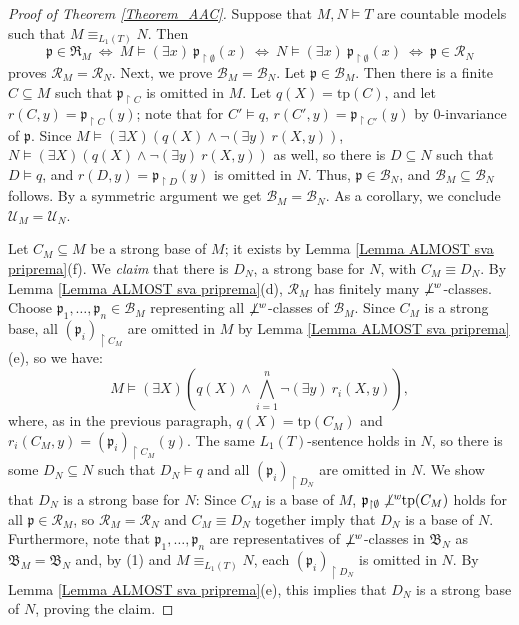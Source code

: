 \documentclass{amsart}
\theoremstyle{definition}
\theoremstyle{definition}
\def\strok{\restriction}
\newcommand{\nwor}{\not\perp\hspace*{-0.4em}^{\mathit w}}
\newcommand{\tp}{\mathrm{tp}}
\begin{document}
\begin{proof}[Proof of Theorem \ref{Theorem_AAC}]
    Suppose that $M,N\models T$ are countable models such that $M\equiv_{L_1(T)}N$. Then 
    $$\mathfrak p\in\mathfrak R_M \ \Leftrightarrow \  M\models (\exists x)\ \mathfrak p_{\strok\emptyset}(x) \ \Leftrightarrow \ N\models (\exists x)\ \mathfrak p_{\strok\emptyset}(x) \ \Leftrightarrow \ \mathfrak p\in\mathcal R_N$$ 
    proves $\mathcal R_M=\mathcal R_N$.  Next, we prove $\mathcal B_M=\mathcal B_N$. Let $\mathfrak p\in\mathcal B_M$. Then there is a finite $C\subseteq M$ such that $\mathfrak p_{\strok C}$ is omitted in $M$. Let $q(X)=\tp(C)$, and let $r(C,y)=\mathfrak p_{\strok C}(y)$; note that for $C'\models q$, $r(C',y)=\mathfrak p_{\strok C'}(y)$ by $0$-invariance of $\mathfrak p$. Since $M\models (\exists X)(q(X)\land\lnot(\exists y)\ r(X,y))$, $N\models(\exists X)(q(X)\land\lnot(\exists y)\ r(X,y))$ as well, so there is $D\subseteq N$ such that $D\models q$, and $r(D,y)=\mathfrak p_{\strok D}(y)$ is omitted in $N$. Thus, $\mathfrak p\in\mathcal B_N$, and $\mathcal B_M\subseteq\mathcal B_N$ follows. By a symmetric argument we get $\mathcal B_M=\mathcal B_N$. As a corollary, we conclude $\mathcal U_M=\mathcal U_N$.

Let $C_M\subseteq M$ be a strong base of $M$; it exists by Lemma \ref{Lemma ALMOST sva priprema}(f). We {\it claim} that there is $D_N$, a strong base for $N$, with $C_M\equiv D_N$. By Lemma \ref{Lemma ALMOST sva priprema}(d), $\mathcal R_M$ has finitely many $\nwor$-classes. Choose $\mathfrak p_1,\dots,\mathfrak p_n\in\mathcal B_M$ representing all $\nwor$-classes of $\mathcal B_M$. Since $C_M$ is a strong base, all $(\mathfrak p_i)_{\strok C_M}$ are omitted in $M$ by Lemma \ref{Lemma ALMOST sva priprema}(e), so we have:
\setcounter{equation}{0}
    \begin{equation} 
    M\models(\exists X)\left(q(X)\land\bigwedge_{i=1}^n\lnot(\exists y)\ r_i(X,y)\right),
    \end{equation}
where, as in the previous paragraph, $q(X)=\tp(C_M)$ and $r_i(C_M,y)=(\mathfrak p_i)_{\strok C_M}(y)$. The same $L_1(T)$-sentence holds in $N$, so there is some $D_N\subseteq N$ such that $D_N\models q$ and all $(\mathfrak p_i)_{\strok D_N}$ are omitted in $N$. We show that $D_N$ is a strong base for $N$: Since $C_M$ is a base of $M$, $\mathfrak p_{\strok \emptyset}\nwor \tp(C_M)$ holds for all $\mathfrak p\in \mathcal R_M$, so $\mathcal R_M=\mathcal R_N$ and $C_M\equiv D_N$ together imply that $D_N$ is a base of $N$. Furthermore, note that $\mathfrak p_1,\dots,\mathfrak p_n$ are representatives of $\nwor$-classes in $\mathfrak B_N$ as $\mathfrak B_M=\mathfrak B_N$ and, by (1) and $M\equiv_{L_1(T)}N$, each $(\mathfrak p_i)_{\strok D_N}$ is omitted in $N$. By Lemma \ref{Lemma ALMOST sva priprema}(e), this implies that $D_N$ is a strong base of $N$, proving the claim.


\end{proof}
\end{document}

